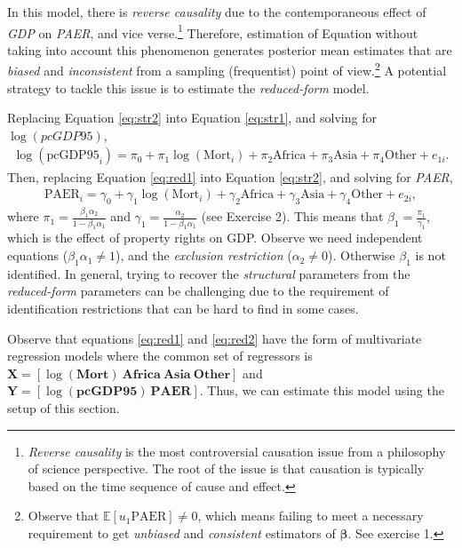 In this model, there is \textit{reverse causality} due to the contemporaneous effect of \textit{GDP} on \textit{PAER}, and vice verse.\footnote{\textit{Reverse causality} is the most controversial causation issue from a philosophy of science perspective. The root of the issue is that causation is typically based on the time sequence of cause and effect.} Therefore, estimation of Equation \label{eq:str1} without taking into account this phenomenon generates posterior mean estimates that are \textit{biased} and \textit{inconsistent} from a sampling (frequentist) point of view.\footnote{Observe that $\mathbb{E}[u_1\text{PAER}]\neq 0$, which means failing to meet a necessary requirement to get \textit{unbiased} and \textit{consistent} estimators of $\bm{\beta}$. See exercise 1.} A potential strategy to tackle this issue is to estimate the \textit{reduced-form} model.

Replacing Equation \ref{eq:str2} into Equation \ref{eq:str1}, and solving for $\log(\textit{pcGDP95})$,
\begin{align}\label{eq:red1}
	\log(\text{pcGDP95}_i)=\pi_0+\pi_1\log(\text{Mort}_i)+\pi_2 \text{Africa}+\pi_3 \text{Asia}+\pi_4 \text{Other}+e_{1i}.   
\end{align}
Then, replacing Equation \ref{eq:red1} into Equation \ref{eq:str2}, and solving for \textit{PAER},
\begin{align}\label{eq:red2}
	\text{PAER}_i=\gamma_0+\gamma_1\log(\text{Mort}_i)+\gamma_2 \text{Africa}+\gamma_3 \text{Asia}+\gamma_4 \text{Other}+e_{2i},
\end{align}
where $\pi_1=\frac{\beta_1\alpha_2}{1-\beta_1\alpha_1}$ and $\gamma_1=\frac{\alpha_2}{1-\beta_1\alpha_1}$ (see Exercise 2). This means that $\beta_1=\frac{\pi_1}{\gamma_1}$, which is the effect of property rights on GDP. Observe we need independent equations ($\beta_1\alpha_1\neq 1$), and the \textit{exclusion restriction} ($\alpha_2\neq 0$). Otherwise $\beta_1$ is not identified. In general, trying to recover the \textit{structural} parameters from the \textit{reduced-form} parameters can be challenging due to the requirement of identification restrictions that can be hard to find in some cases.

Observe that equations \ref{eq:red1} and \ref{eq:red2} have the form of multivariate regression models where the common set of regressors is $\bm{X}=\left[\log(\textbf{Mort}) \ \textbf{Africa} \ \textbf{Asia} \ \textbf{Other}\right]$ and $\bm{Y}=\left[\log(\textbf{pcGDP95}) \ \textbf{PAER}\right]$. Thus, we can estimate this model using the setup of this section.

